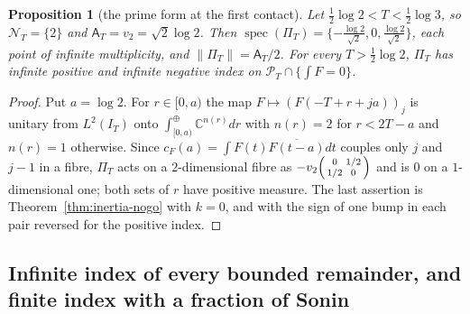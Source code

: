 \documentclass[11pt]{amsart}
\newtheorem{proposition}[theorem]{Proposition}
\theoremstyle{definition}
\theoremstyle{remark}
\newcommand{\C}{\mathbb C}
\newcommand{\PT}{\mathcal P_T}
\newcommand{\IT}{I_T}
\newcommand{\cF}{c_F}
\newcommand{\NT}{\mathcal N_T}
\newcommand{\Aconst}{\mathsf A_T}
\newcommand{\PiT}{\Pi_T}
\begin{document}
\begin{proposition}[the prime form at the first contact]\label{thm:inertia-B2}
Let $\frac12\log2<T<\frac12\log3$, so $\NT=\{2\}$ and $\Aconst=v_2=\sqrt2\log2$. Then
$\operatorname{spec}(\PiT)=\{-\frac{\log2}{\sqrt2},0,\frac{\log2}{\sqrt2}\}$, each point of infinite multiplicity,
and $\|\PiT\|=\Aconst/2$. For every $T>\frac12\log2$, $\PiT$ has infinite positive and infinite negative index
on $\PT\cap\{\int F=0\}$.
\end{proposition}
\begin{proof}
Put $a=\log2$. For $r\in[0,a)$ the map $F\mapsto(F(-T+r+ja))_{j}$ is unitary from $L^2(\IT)$ onto
$\int^\oplus_{[0,a)}\C^{n(r)}dr$ with $n(r)=2$ for $r<2T-a$ and $n(r)=1$ otherwise. Since
$\cF(a)=\int F(t)\overline{F(t-a)}dt$ couples only $j$ and $j-1$ in a fibre, $\PiT$ acts on a $2$-dimensional fibre
as $-v_2\begin{psmallmatrix}0&1/2\\1/2&0\end{psmallmatrix}$ and is $0$ on a $1$-dimensional one; both sets of $r$
have positive measure. The last assertion is Theorem~\ref{thm:inertia-nogo} with $k=0$, and with the sign of one
bump in each pair reversed for the positive index.
\end{proof}

\subsection{Infinite index of every bounded remainder, and finite index with a fraction of Sonin}
\end{document}
